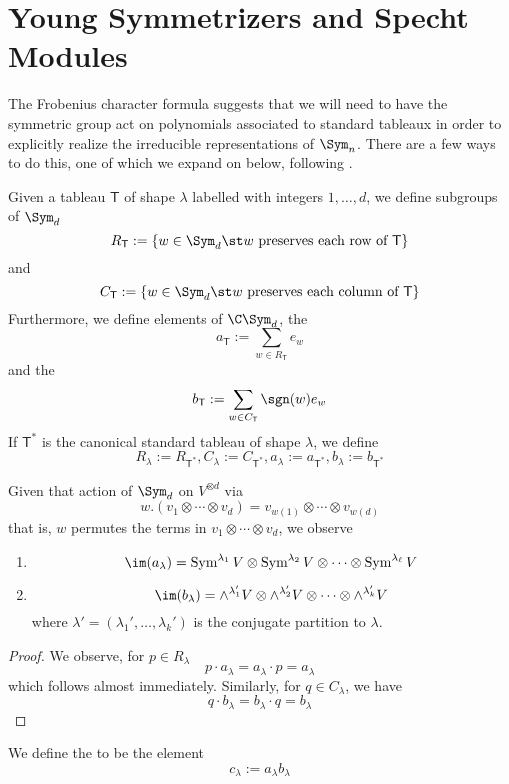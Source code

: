 \documentclass[11pt,leqno,oneside]{amsart}
\numberwithin{thm}{section}
\newcommand{\T}{\mathsf{T}}
\newcommand{\SymP}{\operatorname{Sym}}
\newcommand{\ExtP}{\wedge}
\begin{document}
\section{Young Symmetrizers and Specht Modules}
The Frobenius character formula suggests that we will need to have the
symmetric group act on polynomials associated to standard
tableaux in order to explicitly realize the irreducible
representations of \(\Sym_n\). There are a few ways to do this, one
of which we expand on below, following \cite{fulton-harris}.
\begin{defn}
  Given a tableau \(\T\) of shape \(\lambda\) labelled with integers
  \(1, \ldots, d\), we define subgroups of \(\Sym_d\) \[
    R_\T := \{w \in \Sym_d \st w \text{ preserves each row of
    }\T\}
  \]
  and \[
    C_\T := \{w \in \Sym_d \st w \text{ preserves each column of
    }\T\}
  \]
  Furthermore, we define elements of \(\C\Sym_d\), the  \[
    a_\T := \sum_{w \in R_\T} e_w
  \]
  and the  \[
    b_\T := \sum_{w \in C_\T} \sgn(w) e_w
  \]
  If \(\T^*\) is the canonical standard tableau of shape \(\lambda\), we
  define \[
    R_\lambda := R_{\T^*}, C_\lambda := C_{\T^*}, a_\lambda :=
    a_{\T^*}, b_{\lambda} := b_{\T^*}
  \]
\end{defn}
\begin{prop}
  Given that action of \(\Sym_d\) on \(V^{\otimes d}\) via \[
    w.(v_1 \otimes \cdots \otimes v_d) = v_{w(1)} \otimes \cdots
    \otimes v_{w(d)}
  \]
  that is, \(w\) permutes the terms in \(v_1 \otimes \cdots \otimes
  v_d\), we observe
  \begin{enumerate}
  \item \[
      \im(a_\lambda) = \SymP^{\lambda_1} V \otimes \SymP^{\lambda_2} V
      \otimes \cdots \otimes \SymP^{\lambda_\ell} V
    \]
  \item \[
      \im(b_\lambda) = \ExtP^{\lambda_1'} V \otimes \ExtP^{\lambda'_2} V
      \otimes \cdots \otimes \ExtP^{\lambda'_k} V
    \]
    where \(\lambda' = (\lambda_1', \ldots, \lambda_k')\) is the
    conjugate partition to \(\lambda\).
  \end{enumerate}
\end{prop}
\begin{proof}
  We observe, for \(p \in R_\lambda\) \[
    p \cdot a_\lambda = a_\lambda \cdot p = a_\lambda
  \]
  which follows almost immediately. Similarly, for \(q \in
  C_\lambda\), we have \[
    q \cdot b_\lambda = b_\lambda \cdot q = b_\lambda
  \]
\end{proof}
\begin{defn}
  We define the  to be the element \[
    c_\lambda := a_\lambda b_\lambda
  \]
\end{defn}
\end{document}
